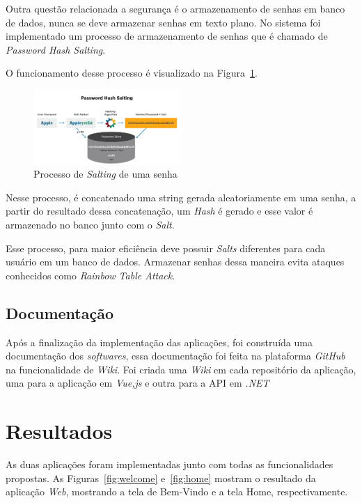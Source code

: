 \documentclass[12pt]{article}
\begin{document}
Outra questão relacionada a segurança é o armazenamento de senhas em banco de dados, nunca
se deve armazenar senhas em texto plano. No sistema foi implementado um processo de armazenamento
de senhas que é chamado de \textit{Password Hash Salting}.

O funcionamento desse processo é visualizado na Figura~\ref{fig:salt}.

\begin{figure}[h]
    \centering
    \includegraphics[width=0.5\textwidth]{security/password-salt.png}
    \caption{Processo de \textit{Salting} de uma senha}\label{fig:salt}
\end{figure}

Nesse processo, é concatenado uma string gerada aleatoriamente em uma senha, a partir do resultado
dessa concatenação, um \textit{Hash} é gerado e esse valor é armazenado no banco junto com o \textit{Salt}.

Esse processo, para maior eficiência deve possuir \textit{Salts} diferentes para cada usuário em um banco de dados.
Armazenar senhas dessa maneira evita ataques conhecidos como \textit{Rainbow Table Attack}.

\subsection{Documentação}

Após a finalização da implementação das aplicações, foi construída uma documentação
dos \textit{softwares}, essa documentação foi feita na plataforma \textit{GitHub} na funcionalidade
de \textit{Wiki}. Foi criada uma \textit{Wiki} em cada repositório da aplicação, uma para a aplicação em \textit{Vue,js}
e outra para a API em \textit{.NET}

\section{Resultados}\label{Resultados}

As duas aplicações foram implementadas junto com todas as funcionalidades propostas.
As Figuras~\ref{fig:welcome} e~\ref{fig:home} mostram o resultado da aplicação \textit{Web},
mostrando a tela de Bem-Vindo e a tela Home, respectivamente.
\end{document}
